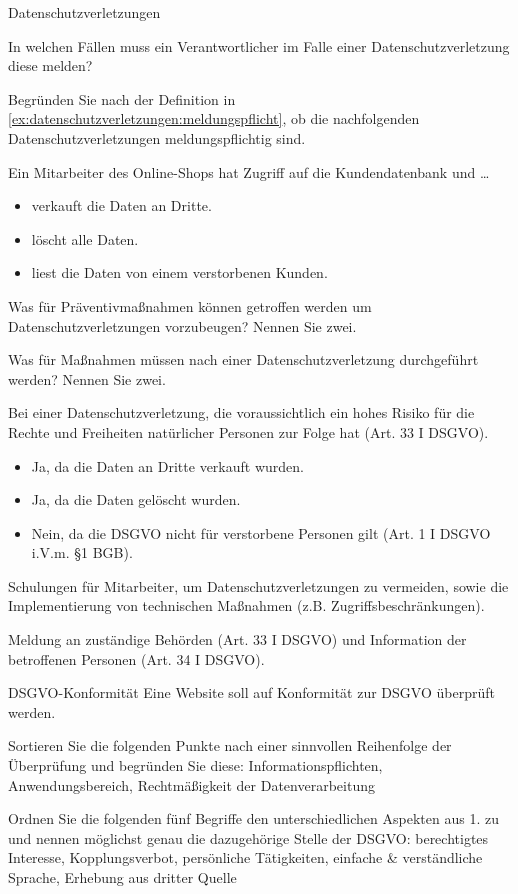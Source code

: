 \documentclass{article}
\begin{document}
\begin{exercises}{Datenschutzverletzungen}
\item\label{ex:datenschutzverletzungen:meldungspflicht} In welchen Fällen muss ein Verantwortlicher im Falle einer Datenschutzverletzung diese melden?
\item Begründen Sie nach der Definition in \ref{ex:datenschutzverletzungen:meldungspflicht}, ob die nachfolgenden Datenschutzverletzungen meldungspflichtig sind.\par
Ein Mitarbeiter des Online-Shops hat Zugriff auf die Kundendatenbank und \ldots
\begin{itemize}
  \item verkauft die Daten an Dritte.
  \item löscht alle Daten.
  \item liest die Daten von einem verstorbenen Kunden.
\end{itemize}
\item Was für Präventivmaßnahmen können getroffen werden um Datenschutzverletzungen vorzubeugen? Nennen Sie zwei.
\item Was für Maßnahmen müssen nach einer Datenschutzverletzung durchgeführt werden? Nennen Sie zwei.
\end{exercises}

\begin{solutions}
  \item Bei einer Datenschutzverletzung, die voraussichtlich ein hohes Risiko für die Rechte und Freiheiten natürlicher Personen zur Folge hat (Art. 33 I DSGVO).
  \item
  \begin{itemize}
    \item Ja, da die Daten an Dritte verkauft wurden.
    \item Ja, da die Daten gelöscht wurden.
    \item Nein, da die DSGVO nicht für verstorbene Personen gilt (Art. 1 I DSGVO i.V.m. §1 BGB).
  \end{itemize}
  \item Schulungen für Mitarbeiter, um Datenschutzverletzungen zu vermeiden, sowie die Implementierung von technischen Maßnahmen (z.B. Zugriffsbeschränkungen).
  \item Meldung an zuständige Behörden (Art. 33 I DSGVO) und Information der betroffenen Personen (Art. 34 I DSGVO).
\end{solutions}

\begin{eexercises}{DSGVO-Konformität}{
    Eine Website soll auf Konformität zur DSGVO überprüft werden.
  }
  \item Sortieren Sie die folgenden Punkte nach einer sinnvollen Reihenfolge der Überprüfung und begründen Sie diese: Informationspflichten, Anwendungsbereich, Rechtmäßigkeit der Datenverarbeitung
  \item Ordnen Sie die folgenden fünf Begriffe den unterschiedlichen Aspekten aus 1. zu und nennen möglichst genau die dazugehörige Stelle der DSGVO: berechtigtes Interesse, Kopplungsverbot, persönliche Tätigkeiten, einfache \& verständliche Sprache, Erhebung aus dritter Quelle
\end{eexercises}
\end{document}
